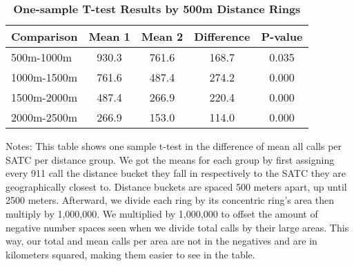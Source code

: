 \begin{table}[htbp]
\centering
\begin{tabular}{l|c c c c}
\hline
Comparison & Mean 1 & Mean 2 & Difference & P-value \\
\hline
500m-1000m & 930.3 & 761.6 & 168.7 & 0.035 \\
1000m-1500m & 761.6 & 487.4 & 274.2 & 0.000 \\
1500m-2000m & 487.4 & 266.9 & 220.4 & 0.000 \\
2000m-2500m & 266.9 & 153.0 & 114.0 & 0.000 \\
\hline
\end{tabular}
\caption{\textbf{One-sample T-test Results by 500m Distance Rings}}
\label{tab:ttests_500}
\centering\small{Notes: This table shows one sample t-test in the difference of mean all calls per SATC per distance group. We got the means for each group by first assigning every 911 call the distance bucket they fall in respectively to the SATC they are geographically closest to. Distance buckets are spaced 500 meters apart, up until 2500 meters. Afterward, we divide each ring by its concentric ring's area then multiply by 1,000,000. We multiplied by 1,000,000 to offset the amount of negative number spaces seen when we divide total calls by their large areas. This way, our total and mean calls per area are not in the negatives and are in kilometers squared, making them easier to see in the table.}
\end{table}
